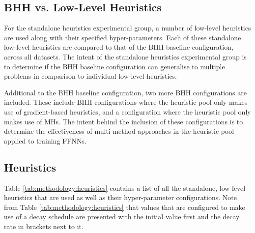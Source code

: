 \documentclass[preprint,review,12pt]{elsarticle}
\begin{document}
\begin{table}[htb]
	\centering
	\caption{The \acs{BHH} baseline configuration as it is used in the empirical study.}
	\label{tab:methodology:bhh_baseline_configuration}%
	\par\bigskip
\end{table}%


\subsection{BHH vs. Low-Level Heuristics}
\label{sec:methodology:experiments}

For the standalone heuristics experimental group, a number of low-level heuristics are used along with their specified hyper-parameters. Each of these standalone low-level heuristics are compared to that of the \acs{BHH} baseline configuration, across all datasets. The intent of the standalone heuristics experimental group is to determine if the \acs{BHH} baseline configuration can generalise to multiple problems in comparison to individual low-level heuristics.

Additional to the \acs{BHH} baseline configuration, two more \acs{BHH} configurations are included. These include \acs{BHH} configurations where the heuristic pool only makes use of gradient-based heuristics, and a configuration where the heuristic pool only makes use of \acp{MH}. The intent behind the inclusion of these configurations is to determine the effectiveness of multi-method approaches in the heuristic pool applied to training \acp{FFNN}.

\subsection{Heuristics}\label{sec:methodology:heuristics}

Table \ref{tab:methodology:heuristics} contains a list of all the standalone, low-level heuristics that are used as well as their hyper-parameter configurations. Note from Table \ref{tab:methodology:heuristics} that values that are configured to make use of a decay schedule are presented with the initial value first and the decay rate in brackets next to it.
\end{document}
